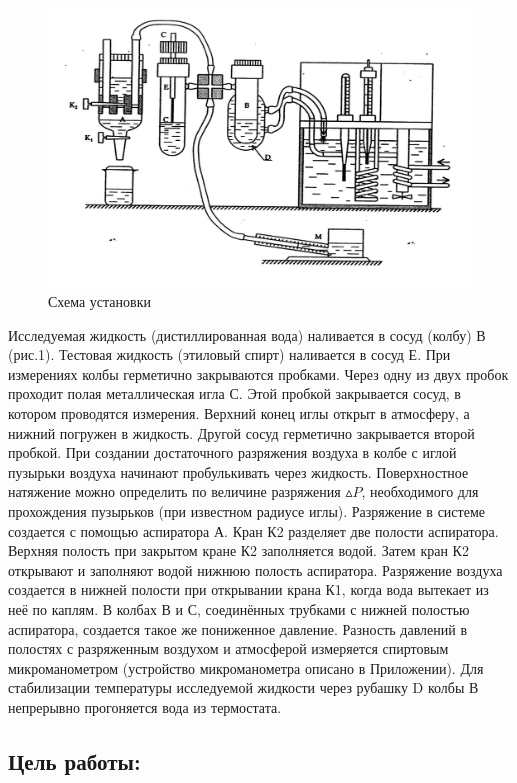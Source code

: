 \documentclass[a4paper,12pt]{article}
\theoremstyle{plain} %
\theoremstyle{definition} %
\theoremstyle{remark} %
\begin{document}
\begin{figure}\label{Pic1}
	\includegraphics[width=\linewidth]{Scheme.jpg}
	\caption{Схема установки}
\end{figure}Исследуемая жидкость (дистиллированная вода) наливается в сосуд (колбу) В (рис.1). Тестовая жидкость  (этиловый спирт) наливается  в сосуд Е.  При измерениях  колбы герметично закрываются  пробками.   Через одну из двух пробок  проходит полая металлическая игла С. Этой пробкой закрывается сосуд, в котором  проводятся измерения. Верхний конец иглы открыт в атмосферу, а нижний погружен в жидкость. Другой сосуд герметично закрывается второй пробкой. При создании достаточного  разряжения воздуха в колбе с иглой пузырьки воздуха начинают пробулькивать через жидкость. Поверхностное натяжение можно определить по величине разряжения $\vartriangle P$, необходимого для прохождения пузырьков (при известном радиусе иглы).
Разряжение в системе создается с помощью аспиратора А. Кран К2 разделяет две полости аспиратора. Верхняя полость при закрытом кране К2  заполняется водой. Затем кран К2 открывают и заполняют водой  нижнюю полость  аспиратора.  Разряжение воздуха создается в нижней полости  при открывании крана К1, когда  вода вытекает из неё по каплям. В колбах В и С, соединённых трубками с нижней полостью аспиратора,  создается такое же пониженное давление. Разность давлений в полостях с разряженным воздухом и атмосферой измеряется спиртовым микроманометром (устройство микроманометра описано в Приложении). 
Для стабилизации температуры исследуемой жидкости через рубашку D колбы В непрерывно прогоняется вода из термостата.

\subsection{Цель работы:}
\end{document}
